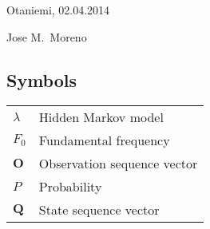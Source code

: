 \documentclass[english,12pt,a4paper,pdftex]{article}
\begin{document}
\vspace{3cm}
Otaniemi, 02.04.2014

\vspace{15mm}
{Jose M.\ Moreno \hspace{1cm}}

\newpage

\thesistableofcontents

\newpage
\listoffigures

\newpage
\listoftables

\subsection*{Symbols}
\begin{tabular}{l l}
	$\lambda$		& Hidden Markov model\\
	$F_{0}$		& Fundamental frequency\\
	$\mathbf{O}$	& Observation sequence vector\\
	$P$			 	& Probability\\
	$\mathbf{Q}$	& State sequence vector
\end{tabular}
\end{document}
